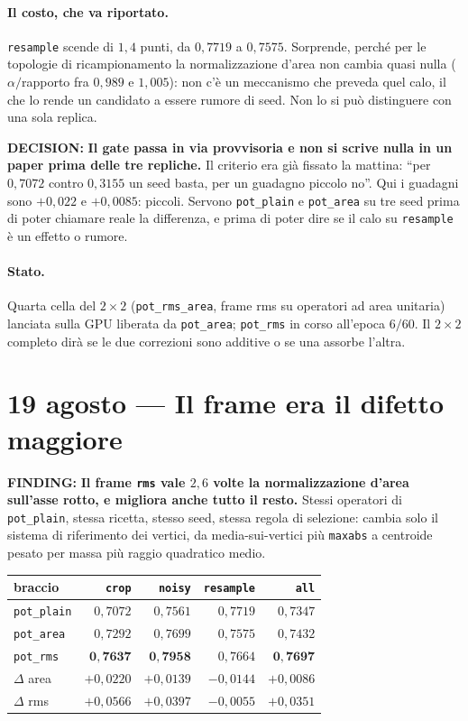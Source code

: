 \documentclass[11pt,a4paper]{article}
\newcommand{\finding}[1]{\textcolor{finding}{\textbf{FINDING:}} #1}
\newcommand{\decision}[1]{\textcolor{decision}{\textbf{DECISION:}} #1}
\begin{document}
\paragraph{Il costo, che va riportato.} \texttt{resample} scende di $1{,}4$ punti, da $0{,}7719$
a $0{,}7575$. Sorprende, perch\'e per le topologie di ricampionamento la normalizzazione d'area
non cambia quasi nulla ($\alpha/$rapporto fra $0{,}989$ e $1{,}005$): non c'\`e un meccanismo che
preveda quel calo, il che lo rende un candidato a essere rumore di seed. Non lo si pu\`o
distinguere con una sola replica.

\decision{\textbf{Il gate passa in via provvisoria e non si scrive nulla in un paper prima delle
tre repliche.} Il criterio era gi\`a fissato la mattina: ``per $0{,}7072$ contro $0{,}3155$ un
seed basta, per un guadagno piccolo no''. Qui i guadagni sono $+0{,}022$ e $+0{,}0085$: piccoli.
Servono \texttt{pot\_plain} e \texttt{pot\_area} su tre seed prima di poter chiamare reale la
differenza, e prima di poter dire se il calo su \texttt{resample} \`e un effetto o rumore.}

\paragraph{Stato.} Quarta cella del $2\times2$ (\texttt{pot\_rms\_area}, frame rms su operatori
ad area unitaria) lanciata sulla GPU liberata da \texttt{pot\_area}; \texttt{pot\_rms} in corso
all'epoca $6/60$. Il $2\times2$ completo dir\`a se le due correzioni sono additive o se una
assorbe l'altra.


\section{19 agosto --- Il frame era il difetto maggiore}

\finding{\textbf{Il frame \texttt{rms} vale $2{,}6$ volte la normalizzazione d'area sull'asse
rotto, e migliora anche tutto il resto.} Stessi operatori di \texttt{pot\_plain}, stessa ricetta,
stesso seed, stessa regola di selezione: cambia solo il sistema di riferimento dei vertici, da
media-sui-vertici pi\`u \texttt{maxabs} a centroide pesato per massa pi\`u raggio quadratico
medio.}

\begin{center}\small
\begin{tabular}{lrrrr}
\toprule
braccio & \texttt{crop} & \texttt{noisy} & \texttt{resample} & \texttt{all} \\
\midrule
\texttt{pot\_plain} & $0{,}7072$ & $0{,}7561$ & $0{,}7719$ & $0{,}7347$ \\
\texttt{pot\_area}  & $0{,}7292$ & $0{,}7699$ & $0{,}7575$ & $0{,}7432$ \\
\texttt{pot\_rms}   & $\mathbf{0{,}7637}$ & $\mathbf{0{,}7958}$ & $0{,}7664$ & $\mathbf{0{,}7697}$ \\
\midrule
$\Delta$ area       & $+0{,}0220$ & $+0{,}0139$ & $-0{,}0144$ & $+0{,}0086$ \\
$\Delta$ rms        & $+0{,}0566$ & $+0{,}0397$ & $-0{,}0055$ & $+0{,}0351$ \\
\bottomrule
\end{tabular}
\end{center}
\end{document}
